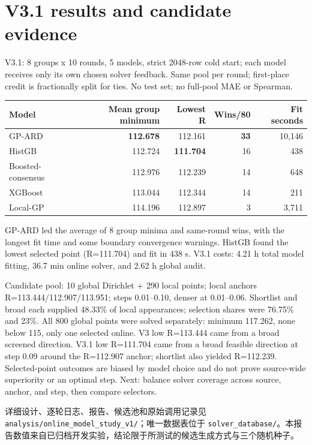 \documentclass[8pt,a4paper]{article}
\begin{document}
\section{V3.1 results and candidate evidence}
V3.1: 8 groups x 10 rounds, 5 models, strict 2048-row cold start; each model receives only its own chosen solver feedback. Same pool per round; first-place credit is fractionally split for ties. No test set; no full-pool MAE or Spearman.\par
\footnotesize
\begin{tabularx}{\linewidth}{@{}lrrrr@{}}\toprule Model & Mean group minimum & Lowest R & Wins/80 & Fit seconds \\ \midrule GP-ARD & \textbf{112.678} & 112.161 & \textbf{33} & 10,146 \\ HistGB & 112.724 & \textbf{111.704} & 16 & 438 \\ Boosted-consensus & 112.976 & 112.239 & 14 & 648 \\ XGBoost & 113.044 & 112.344 & 14 & 211 \\ Local-GP & 114.196 & 112.897 & 3 & 3,711 \\ \bottomrule\end{tabularx}\par
GP-ARD led the average of 8 group minima and same-round wins, with the longest fit time and some boundary convergence warnings. HistGB found the lowest selected point (R=111.704) and fit in 438 s. V3.1 costs: 4.21 h total model fitting, 36.7 min online solver, and 2.62 h global audit.\par
Candidate pool: 10 global Dirichlet + 290 local points; local anchors R=113.444/112.907/113.951; steps 0.01--0.10, denser at 0.01--0.06. Shortlist and broad each supplied 48.33\% of local appearances; selection shares were 76.75\% and 23\%. All 800 global points were solved separately: minimum 117.262, none below 115, only one selected online. V3 low R=113.444 came from a broad screened direction. V3.1 low R=111.704 came from a broad feasible direction at step 0.09 around the R=112.907 anchor; shortlist also yielded R=112.239. Selected-point outcomes are biased by model choice and do not prove source-wide superiority or an optimal step. Next: balance solver coverage across source, anchor, and step, then compare selectors.\par
\normalsize
\vfill
{\footnotesize 详细设计、逐轮日志、报告、候选池和原始调用记录见 \texttt{analysis/online\_model\_study\_v1/}；唯一数据表位于 \texttt{solver\_database/}。本报告数值来自已归档开发实验，结论限于所测试的候选生成方式与三个随机种子。}
\end{document}
